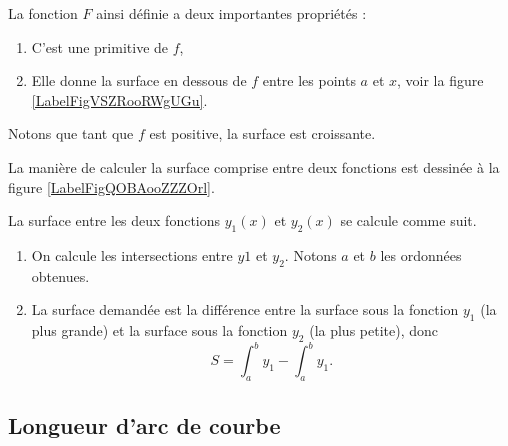 \newcommand{\CaptionFigVSZRooRWgUGu}{Surface sous une courbe}


La fonction $F$ ainsi définie a deux importantes propriétés :
\begin{enumerate}

\item
C'est une primitive de $f$,
\item
Elle donne la surface en dessous de $f$ entre les points $a$ et $x$, voir la figure \ref{LabelFigVSZRooRWgUGu}.

\end{enumerate}

Notons que tant que $f$ est positive, la surface est croissante.

La manière de calculer la surface comprise entre deux fonctions est dessinée à la figure \ref{LabelFigQOBAooZZZOrl}. %
\newcommand{\CaptionFigQOBAooZZZOrl}{Le calcul de la surface comprise entre deux fonctions.}


La surface entre les deux fonctions $y_1(x)$ et $y_2(x)$ se calcule comme suit.
\begin{enumerate}

\item
On calcule les intersections entre $y1$ et $y_2$. Notons $a$ et $b$ les ordonnées obtenues.
\item
La surface demandée est la différence entre la surface sous la fonction $y_1$ (la plus grande) et la surface sous la fonction $y_2$ (la plus petite), donc
\begin{equation}
	S=\int_{a}^by_1-\int_a^by_1.
\end{equation}

\end{enumerate}

					\subsection{Longueur d'arc de courbe}

